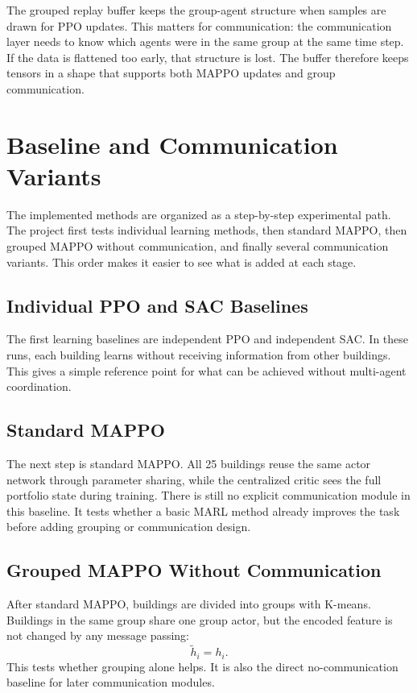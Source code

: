 \begin{itemize}
The grouped replay buffer keeps the group-agent structure when samples are drawn
for PPO updates. This matters for communication: the communication layer needs
to know which agents were in the same group at the same time step. If the data is
flattened too early, that structure is lost. The buffer therefore keeps tensors
in a shape that supports both MAPPO updates and group communication.

\section{Baseline and Communication Variants}

The implemented methods are organized as a step-by-step experimental path. The
project first tests individual learning methods, then standard MAPPO, then
grouped MAPPO without communication, and finally several communication variants.
This order makes it easier to see what is added at each stage.

\subsection{Individual PPO and SAC Baselines}

The first learning baselines are independent PPO and independent SAC. In these
runs, each building learns without receiving information from other buildings.
This gives a simple reference point for what can be achieved without multi-agent
coordination.

\subsection{Standard MAPPO}

The next step is standard MAPPO. All 25 buildings reuse the same actor network
through parameter sharing, while the centralized critic sees the full portfolio
state during training. There is still no explicit communication module in this
baseline. It tests whether a basic MARL method already improves the task before
adding grouping or communication design.

\subsection{Grouped MAPPO Without Communication}

After standard MAPPO, buildings are divided into groups with K-means. Buildings
in the same group share one group actor, but the encoded feature is not changed
by any message passing:
\[
\tilde{h}_i = h_i .
\]
This tests whether grouping alone helps. It is also the direct no-communication
baseline for later communication modules.


\end{itemize}
